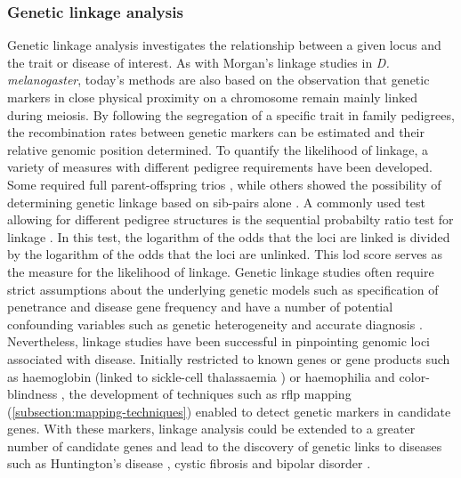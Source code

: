 \subsubsection{Genetic linkage analysis}
Genetic linkage analysis investigates the relationship between a given locus and the trait or disease of interest.  As with Morgan's linkage studies in \textit{D. melanogaster}, today's methods are also based on the observation that genetic markers in close physical proximity on a chromosome remain mainly linked during meiosis. By following the segregation of a specific trait in family pedigrees, the recombination rates between genetic markers can be estimated and their relative genomic position determined. To quantify the likelihood of linkage, a variety of measures with different pedigree requirements have been developed. Some required full parent-offspring trios \citep{Bernstein1930,Haldane1934}, while others showed the possibility of determining genetic linkage based on sib-pairs alone \citep{Penrose1935}. A commonly used test allowing for different pedigree structures is the sequential probabilty ratio test for linkage \citep{Morton1955,Pulst1999}. In this test, the logarithm of the odds that the loci are linked is divided by the logarithm of the odds that the loci are unlinked. This \gls{lod} score serves as the measure for the likelihood of linkage. Genetic linkage studies often require strict assumptions about the underlying genetic models such as specification of penetrance and disease gene frequency \citep{Morton1955,Pulst1999} and have a number of potential confounding variables such as genetic heterogeneity and accurate diagnosis \citep{Bird1993}. Nevertheless, linkage studies have been successful in pinpointing genomic loci associated with disease.  Initially restricted to known genes or gene products such as haemoglobin (linked to sickle-cell thalassaemia \citep{Ingram1959}) or haemophilia and color-blindness \citep{Haldane1947}, the development of techniques such as \gls{rflp} mapping (\cref{subsection:mapping-techniques}) enabled to detect genetic markers in candidate genes. With these markers, linkage analysis could be extended to a greater number of candidate genes and  lead to the discovery of genetic links to diseases such as Huntington's disease \citep{Gusella1983}, cystic fibrosis \citep{Kerem1989} and bipolar disorder \citep{Baron1987}. 

